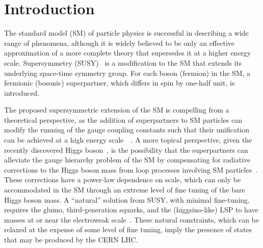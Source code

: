 \section{Introduction}
\label{sec:introduction}

The standard model (SM) of particle physics is successful in
describing a wide range of phenomena, although it is widely believed
to be only an effective approximation of a more complete theory that
supersedes it at a higher energy scale. Supersymmetry
(SUSY)~\cite{ref:SUSY-1, ref:SUSY0, ref:SUSY3, ref:SUSY1} is a
modification to the SM that extends its underlying space-time symmetry
group. For each boson (fermion) in the SM, a fermionic (bosonic)
superpartner, which differs in spin by one-half unit, is introduced.

The proposed supersymmetric extension of the SM is compelling from a
theoretical perspective, as the addition of superpartners to SM
particles can modify the running of the gauge coupling constants such
that their unification can be achieved at a high energy
scale~~\cite{Dimopoulos:1981yj, Ibanez:1981yh, Marciano:1981un}. A
more topical perspective, given the recently discovered Higgs
boson~\cite{ref:atlashiggsdiscovery, ref:cmshiggsdiscovery,
  ref:cmshiggsdiscoverylong}, is the possibility that the
superpartners can alleviate the gauge hierarchy problem of the SM by
compensating for radiative corrections to the Higgs boson mass from
loop processes involving SM particles~\cite{ref:hierarchy1,
  ref:hierarchy2}. These corrections have a power-law dependence on
scale, which can only be accommodated in the SM through an extreme
level of fine tuning of the bare Higgs boson mass. A ``natural''
solution from SUSY, with minimal fine-tuning, requires the gluino,
third-generation squarks, and the (higgsino-like) LSP to have masses
at or near the electroweak scale~\cite{ref:barbierinsusy}. These
natural constraints, which can be relaxed at the expense of some level
of fine tuning, imply the presence of states that may be produced by
the CERN LHC.


